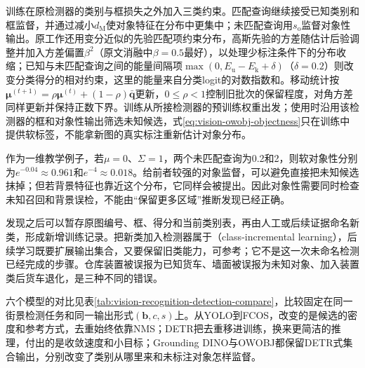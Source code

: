 训练在原检测器的类别与框损失之外加入三类约束。匹配查询继续接受已知类别和框监督，并通过减小$d_{\mathrm M}$使对象特征在分布中更集中；未匹配查询用$s_{\mathrm{o}}$监督对象性输出。原工作还用变分近似的先验匹配项约束分布，高斯先验的方差随估计后验调整并加入方差偏置$\beta^2$（原文消融中$\beta=0.5$最好），以处理少标注条件下的分布收缩；已知与未匹配查询之间的能量间隔项$\max(0,E_{\mathrm u}-E_{\mathrm k}+\delta)$（$\delta=0.2$）则改变分类得分的相对约束，这里的能量来自分类logit的对数指数和。移动统计按$\bm\mu^{(t+1)}=\rho\bm\mu^{(t)}+(1-\rho)\bar{\bm q}$更新，$0\leq\rho<1$控制旧批次的保留程度，对角方差同样更新并保持正数下界。训练从所接检测器的预训练权重出发；使用时沿用该检测器的框和对象性输出筛选未知候选，式\eqref{eq:vision-owobj-objectness}只在训练中提供软标签，不能拿新图的真实标注重新估计对象分布。

作为一维教学例子，若$\mu=0$、$\Sigma=1$，两个未匹配查询为0.2和2，则软对象性分别为$e^{-0.04}\approx0.961$和$e^{-4}\approx0.018$。给前者较强的对象监督，可以避免直接把未知候选抹掉；但若背景特征也靠近这个分布，它同样会被提出。因此对象性需要同时检查未知召回和背景误检，不能由“保留更多区域”推断发现已经正确。

发现之后可以暂存原图编号、框、得分和当前类别表，再由人工或后续证据命名新类，形成新增训练记录。把新类加入检测器属于（class-incremental learning），后续学习既要扩展输出集合，又要保留旧类能力，可参考；它不是这一次未命名检测已经完成的步骤。仓库装置被误报为已知货车、墙面被误报为未知对象、加入装置类后货车退化，是三种不同的错误。

六个模型的对比见表\ref{tab:vision-recognition-detection-compare}，比较固定在同一街景检测任务和同一输出形式$(\bm{b},c,s)$上。从YOLO到FCOS，改变的是候选的密度和参考方式，去重始终依靠NMS；DETR把去重移进训练，换来更简洁的推理，付出的是收敛速度和小目标；Grounding DINO与OWOBJ都保留DETR式集合输出，分别改变了类别从哪里来和未标注对象怎样监督。

